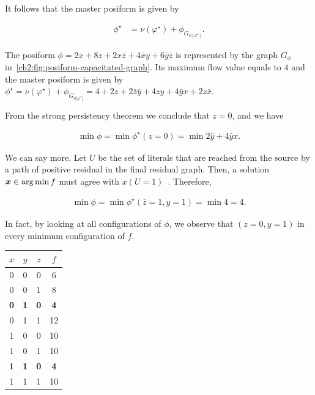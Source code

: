 It follows that the master posiform is given by

\begin{align*}
	\phi^{\star} &= \nu(\varphi^{\star}) + \phi_{ G_{ \phi [ \varphi^{\star}] }}.
\end{align*}

\begin{example}
The posiform $\phi = 2x + 8z + 2x\bar{z} + 4\bar{x}y + 6\bar{y}\bar{z}$ is represented by the graph $G_{\phi}$ in~\cref{ch2:fig:posiform-capacitated-graph}. Its maximum flow value  equals to $4$ and the master posiform is given by $\phi^{\star} = \nu(\varphi ^{\star}) + \phi_{G_{\phi {[\varphi^{\star}}]}} = 4 + 2z + 2\bar{z}\bar{y} + 4zy + 4\bar{y}x + 2z\bar{x}$.
\end{example}

From the strong persistency theorem we conclude that $z=0$, and we have

\begin{align*}
	\min \phi = \min \phi^{\star}(z=0) = \min 2\bar{y} + 4\bar{y}x.
\end{align*}

We can say more. Let $U$ be the set of literals that are reached from the source by a path of positive residual in the final residual graph. Then, a solution $\bm{x} \in \operatorname*{arg\,min} f$ must agree with $x(U=1)$~\cite{boros02pseudo}. Therefore,

\begin{align*}
	\min \phi = \min \phi^{\star}(\bar{z}=1,y=1) = \min 4 = 4.
\end{align*}

In fact, by looking at all configurations of $\phi$, we observe that $(z=0,y=1)$ in every minimum configuration of $f$.

\begin{center}
\begin{tabular}{|c|c|c|c|}
\hline
$x$ & $y$ & $z$ & $f$\\
\hline
0 & 0 & 0 & 6 \\
0 & 0 & 1 & 8 \\
\textbf{0} & \textbf{1} & \textbf{0} & \textbf{4} \\
0 & 1 & 1 & 12 \\
1 & 0 & 0 & 10 \\
1 & 0 & 1 & 10 \\
\textbf{1} & \textbf{1} & \textbf{0} & \textbf{4} \\
1 & 1 & 1 & 10 \\
\hline
\end{tabular}
\end{center}

